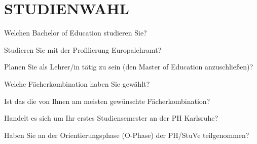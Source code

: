 
\section{\uppercase{Studienwahl}}
\vspace{.25cm}

\begin{choicequestion}[1]{Welchen Bachelor of Education studieren Sie?}
\end{choicequestion}

\separate

\begin{choicequestion}[1]{Studieren Sie mit der Profilierung Europalehramt?}
\end{choicequestion}

\separate

\begin{choicequestion}[1]{Planen Sie als Lehrer/in tätig zu sein (den Master of Education anzuschließen)?}
\end{choicequestion}

\separate

\begin{choicequestion}[1]{Welche Fächerkombination haben Sie gewählt?}
\end{choicequestion}

\separate

\begin{choicequestion}[1]{Ist das die von Ihnen am meisten gewünschte Fächerkombination?}
\end{choicequestion}

\separate

\begin{choicequestion}[1]{Handelt es sich um Ihr erstes Studiensemester an der PH Karlsruhe?}
\end{choicequestion}

\separate

\begin{choicequestion}[1]{Haben Sie an der Orientierungsphase (O-Phase) der PH/StuVe teilgenommen?}
\end{choicequestion}
